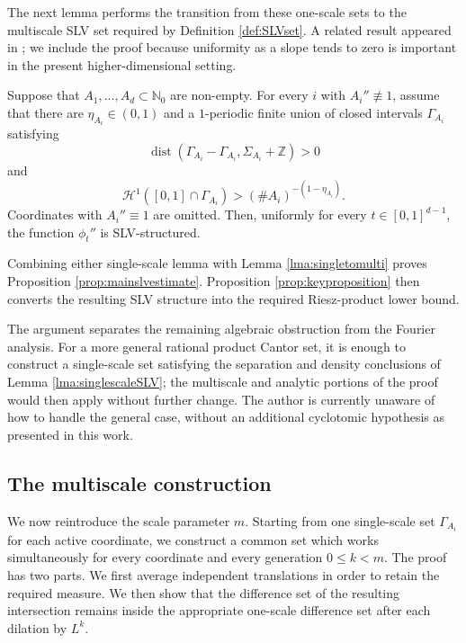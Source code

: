 \documentclass[12pt]{amsart}
\numberwithin{equation}{section}
\DeclareMathOperator{\dist}{dist}
\begin{document}
The next lemma performs the transition from these one-scale sets to the multiscale SLV set required by Definition \ref{def:SLVset}.  A related result appeared in \cite{LM}; we include the proof because uniformity as a slope tends to zero is important in the present higher-dimensional setting.

\medskip

\begin{lemma}\label{lma:singletomulti}
Suppose that $A_1,...,A_d \subset \mathbb{N}_{0}$ are non-empty.  For every
$i$ with $A_i''\not\equiv1$, assume that there are $\eta_{A_i}\in(0,1)$ and
a $1$-periodic finite union of closed intervals $\Gamma_{A_i}$ satisfying
\[
 \dist(\Gamma_{A_i}-\Gamma_{A_i},\Sigma_{A_i}+\mathbb Z)>0
\]
and
\[
 \mathcal H^1([0,1]\cap\Gamma_{A_i})
 >(\#A_i)^{-(1-\eta_{A_i})}.
\]
Coordinates with
$A_i''\equiv1$ are omitted.  Then, uniformly for every
$t \in [0,1]^{d-1}$, the function $\phi_t''$ is SLV-structured.
\end{lemma}

Combining either single-scale lemma with Lemma \ref{lma:singletomulti} proves Proposition \ref{prop:mainslvestimate}.  Proposition \ref{prop:keyproposition} then converts the resulting SLV structure into the required Riesz-product lower bound.

\medskip

\begin{remark}
\rm{
The argument separates the remaining algebraic obstruction from the Fourier analysis.  For a more general rational product Cantor set, it is enough to construct a single-scale set satisfying the separation and density conclusions of Lemma \ref{lma:singlescaleSLV}; the multiscale and analytic portions of the proof would then apply without further change. The author is currently unaware of how to handle the general case, without an additional cyclotomic hypothesis as presented in this work.
}
\end{remark}


\subsection{The multiscale construction}\label{subsec:singletomultiSLV}
We now reintroduce the scale parameter $m$.  Starting from one single-scale set $\Gamma_{A_i}$ for each active coordinate, we construct a common set which works simultaneously for every coordinate and every generation $0\leq k<m$.  The proof has two parts.  We first average independent translations in order to retain the required measure.  We then show that the difference set of the resulting intersection remains inside the appropriate one-scale difference set after each dilation by $L^k$.
\end{document}
